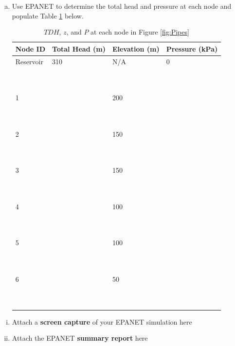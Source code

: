\documentclass[12pt]{article}
\begin{document}
\begin{enumerate}
\begin{enumerate}[a)]
\clearpage
\item Use EPANET to determine the total head and pressure at each node and populate Table \ref{tab:booktabs} below.
\begin{table}[htbp]
      \caption{$TDH$, $z$,  and $P$ at  each node in Figure \ref{fig:Pipes} \\}
   \begin{tabular}{| p{1in} | p{1.1in} | p{1in} | p{1.1in} | } %
   \hline
   \hline
Node ID & Total Head (m) & Elevation (m) & Pressure (kPa) \\
\hline
\hline
Reservoir & 310 & N/A & 0  \\
~ & ~ & ~ & ~  \\
~ & ~ & ~ & ~  \\
\hline
1 & ~ & 200 & ~  \\
~ & ~ & ~ & ~  \\
~ & ~ & ~ & ~  \\
\hline
2 & ~ & 150 & ~  \\
~ & ~ & ~ & ~  \\
~ & ~ & ~ & ~  \\
\hline
3 & ~ & 150 & ~  \\
~ & ~ & ~ & ~  \\
~ & ~ & ~ & ~  \\
\hline
4 & ~ & 100 & ~  \\
~ & ~ & ~ & ~  \\
~ & ~ & ~ & ~  \\
\hline
5 & ~ & 100 & ~  \\
~ & ~ & ~ & ~  \\
~ & ~ & ~ & ~  \\
\hline
6 & ~ & 50 & ~  \\
~ & ~ & ~ & ~  \\
~ & ~ & ~ & ~  \\
\hline
\hline

   \end{tabular}

   \label{tab:booktabs}
\end{table}
\end{enumerate}


\begin{enumerate}[i)]
\item Attach a \textbf{screen capture} of your EPANET simulation here
\item Attach the EPANET \textbf{summary report} here
\end{enumerate}


\end{enumerate}
\end{document}
